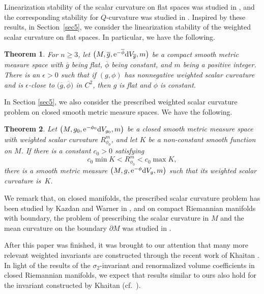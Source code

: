 \documentclass[pdftex]{sigma}
\numberwithin{equation}{section}
\newtheorem{Theorem}{Theorem}[section]
\begin{document}
 Linearization stability of the scalar curvature on flat spaces was studied in \cite{Fischer&Marsden},
 and the corresponding stability for $Q$-curvature was studied in \cite{Lin&Yuan}.
 Inspired by these results, in Section~\ref{sec5}, we consider the linearization stability of the weighted scalar curvature on flat spaces. In particular, we have the following.

\begin{Theorem}\label{rigidity}
 For $n\geq3$, let $\bigl(M,\overline{g},{\rm e}^{-\overline{\phi}}{\rm d}V_{\overline{g}},m\bigr)$ be a compact smooth metric measure space with
 $\overline{g}$ being flat, $\overline{\phi}$ being constant, and $m$ being a positive integer.
 There is an $\epsilon>0$ such that if $(g,\phi)$ has nonnegative weighted scalar curvature and is $\epsilon$-close to $\bigl(\overline{g},\overline{\phi}\bigr)$ in $C^2$, then $g$ is flat and $\phi$ is constant.
\end{Theorem}

In Section \ref{sec5}, we also consider the prescribed weighted scalar curvature problem on closed smooth metric measure spaces.
We have the following.
\begin{Theorem}\label{thm1.3}
 Let $\bigl(M,g_0,{\rm e}^{-\phi_0}{\rm d}V_{g_0},m\bigr)$ be a closed smooth metric measure space with weighted scalar curvature $R_{\phi_0}^m$, and let $K$ be a non-constant smooth function on $M$. If there is a constant $c_0>0$ satisfying
\begin{equation*}
c_0\min K<R_{\phi_0}^m<c_0\max K,
\end{equation*}
there is a smooth metric measure $\bigl(M,g,{\rm e}^{-\phi}{\rm d}V_g,m\bigr)$ such that its weighted scalar curvature is~$K$.
\end{Theorem}

We remark that, on closed manifolds, the prescribed scalar curvature problem has been studied by Kazdan and Warner in \cite{Kazdan&Warner1, Kazdan&Warner4, Kazdan&Warner2, Kazdan&Warner3},
and on compact Riemannian manifolds with boundary, the problem of prescribing the scalar curvature in $M$ and the mean curvature on the boundary $\partial M$ was studied in \cite{Cruz&Vitorio, Ho&Huang}.


 After this paper was finished,
it was brought to our attention that many more relevant weighted invariants are
constructed through the recent work of Khaitan \cite{Khaitan1,Khaitan2}. In light of the results of the $\sigma_2$-invariant and renormalized volume coefficients in closed Riemannian manifolds, we expect that results similar to ours also hold for the invariant constructed by Khaitan (cf.~\cite{Andrade,Silva1}).
\end{document}

